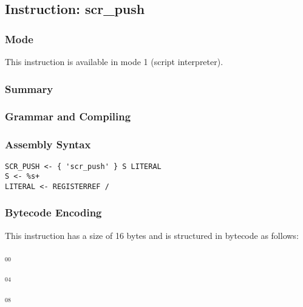 \subsection{Instruction: scr\_push}

\subsubsection{Mode}
This instruction is available in mode 1 (script interpreter).
\subsubsection{Summary}


\subsubsection{Grammar and Compiling}


\subsubsection{Assembly Syntax}

\begin{myquote}
\begin{verbatim}
SCR_PUSH <- { 'scr_push' } S LITERAL
S <- %s+
LITERAL <- REGISTERREF /
\end{verbatim}
\end{myquote}

\subsubsection{Bytecode Encoding}

This instruction has a size of 16 bytes and is structured in bytecode as follows:

$_{00}$\ 



$_{04}$\ 



$_{08}$\ 
\fbox{%
  \parbox{20pt}{%
00
  }%
}



